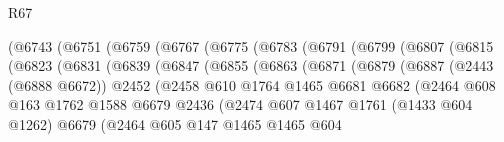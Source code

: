 \begin{lexlean}{R67}
\begin{coremodule}
                  (@6743
                    (@6751
                      (@6759
                        (@6767
                          (@6775
                            (@6783
                              (@6791
                                (@6799
                                  (@6807
                                    (@6815
                                      (@6823
                                        (@6831
                                          (@6839
                                            (@6847
                                              (@6855
                                                (@6863
                                                  (@6871
                                                    (@6879
                                                      (@6887
                                                        (@2443 (@6888 @6672))
                                                        @2452
                                                        (@2458
                                                          @610
                                                          @1764
                                                          @1465
                                                          @6681
                                                          @6682
                                                          (@2464
                                                            @608
                                                            @163
                                                            @1762
                                                            @1588
                                                            @6679
                                                            @2436
                                                            (@2474
                                                              @607
                                                              @1467
                                                              @1761
                                                              (@1433 @604 @1262)
                                                              @6679
                                                              (@2464
                                                                @605
                                                                @147
                                                                @1465
                                                                @1465
                                                                @604

\end{coremodule}
\end{lexlean}

